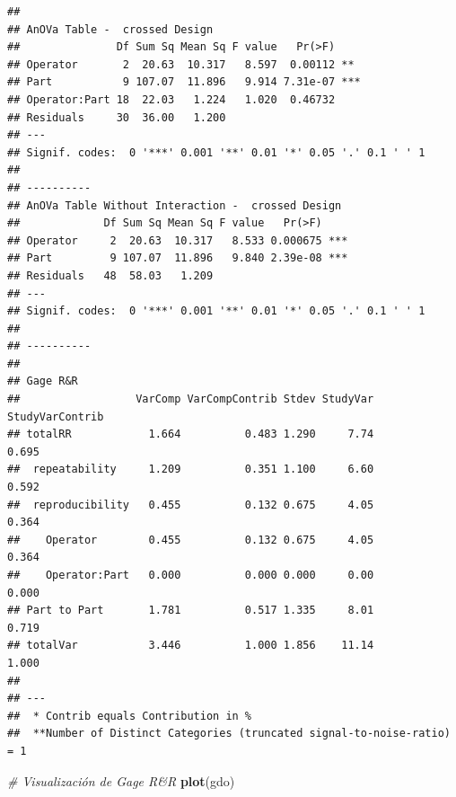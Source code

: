 \documentclass[
]{book}
\newenvironment{Shaded}{\begin{snugshade}}{\end{snugshade}}
\newcommand{\CommentTok}[1]{\textcolor[rgb]{0.56,0.35,0.01}{\textit{#1}}}
\newcommand{\FunctionTok}[1]{\textcolor[rgb]{0.13,0.29,0.53}{\textbf{#1}}}
\newcommand{\NormalTok}[1]{#1}
\begin{document}
\begin{verbatim}
## 
## AnOVa Table -  crossed Design
##               Df Sum Sq Mean Sq F value   Pr(>F)    
## Operator       2  20.63  10.317   8.597  0.00112 ** 
## Part           9 107.07  11.896   9.914 7.31e-07 ***
## Operator:Part 18  22.03   1.224   1.020  0.46732    
## Residuals     30  36.00   1.200                     
## ---
## Signif. codes:  0 '***' 0.001 '**' 0.01 '*' 0.05 '.' 0.1 ' ' 1
## 
## ----------
## AnOVa Table Without Interaction -  crossed Design
##             Df Sum Sq Mean Sq F value   Pr(>F)    
## Operator     2  20.63  10.317   8.533 0.000675 ***
## Part         9 107.07  11.896   9.840 2.39e-08 ***
## Residuals   48  58.03   1.209                     
## ---
## Signif. codes:  0 '***' 0.001 '**' 0.01 '*' 0.05 '.' 0.1 ' ' 1
## 
## ----------
## 
## Gage R&R
##                  VarComp VarCompContrib Stdev StudyVar StudyVarContrib
## totalRR            1.664          0.483 1.290     7.74           0.695
##  repeatability     1.209          0.351 1.100     6.60           0.592
##  reproducibility   0.455          0.132 0.675     4.05           0.364
##    Operator        0.455          0.132 0.675     4.05           0.364
##    Operator:Part   0.000          0.000 0.000     0.00           0.000
## Part to Part       1.781          0.517 1.335     8.01           0.719
## totalVar           3.446          1.000 1.856    11.14           1.000
## 
## ---
##  * Contrib equals Contribution in %
##  **Number of Distinct Categories (truncated signal-to-noise-ratio) = 1
\end{verbatim}

\begin{Shaded}
\begin{Highlighting}[]
\CommentTok{\# Visualización de Gage R\&R}
\FunctionTok{plot}\NormalTok{(gdo)}
\end{Highlighting}
\end{Shaded}
\end{document}
